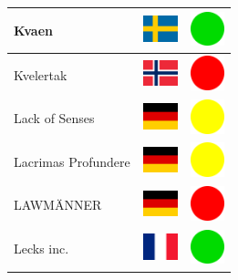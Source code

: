 \documentclass[12pt, a4paper, twoside]{report}
\begin{document}
\begin{center}
\begin{longtable}{|p{5cm}|p{2cm}|p{2cm}|}
 Kvaen                                                      & \includegraphics[width=1cm]{../img/flags/se} &   \includegraphics[width=1cm]{../likes/y} \\ \hline
 Kvelertak                                                  & \includegraphics[width=1cm]{../img/flags/no} &   \includegraphics[width=1cm]{../likes/n} \\ \hline
 Lack of Senses                                             & \includegraphics[width=1cm]{../img/flags/de} &   \includegraphics[width=1cm]{../likes/m} \\ \hline
 Lacrimas Profundere                                        & \includegraphics[width=1cm]{../img/flags/de} &   \includegraphics[width=1cm]{../likes/m} \\ \hline
 LAWMÄNNER                                                  & \includegraphics[width=1cm]{../img/flags/de} &   \includegraphics[width=1cm]{../likes/n} \\ \hline
 Lecks inc.                                                 & \includegraphics[width=1cm]{../img/flags/fr} &   \includegraphics[width=1cm]{../likes/y} \\ \hline

\end{longtable}
\end{center}
\end{document}

